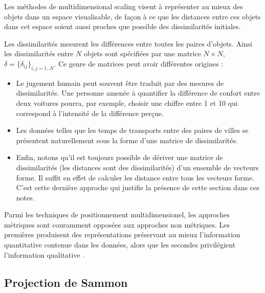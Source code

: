 Les m\'ethodes de  multidimensional scaling visent
\`a repr\'esenter au mieux des objets dans un espace 
visualisable, de fa\c{c}on \`a ce que les distances
entre ces objets dans cet espace 
soient aussi proches que possible des dissimilarit\'es
initiales.

Les dissimilarit\'es mesurent les diff\'erences entre toutes
les paires d'objets. Ainsi les dissimilarit\'es entre $N$ objets
sont sp\'ecifi\'ees par une matrice $N \times N$,
$\delta=\{ \delta_{ij}\}_{i,j=1..N}$. Ce genre de matrices
peut avoir  diff\'erentes origines    :
\begin{itemize}
\item Le jugement humain peut souvent \^etre traduit par des
mesures de  dissimilarit\'es. Une personne amen\'ee \`a quantifier
la diff\'erence de confort entre deux voitures  pourra, par
exemple, choisir une chiffre entre 1 et 10 qui correspond 
\`a l'intensit\'e de la diff\'erence per\c{c}ue.
\item Les donn\'ees telles que les temps de transports entre
des paires de villes se pr\'esentent naturellement sous la forme
d'une matrice de dissimilarit\'es.
\item Enfin, notons qu'il est toujours possible de d\'eriver
une matrice de dissimilarit\'es 
(les distances sont des dissimilarit\'es) d'un ensemble de vecteurs
forme. Il suffit en effet de calculer les distance entre
tous les vecteurs forme. C'est cette derni\`ere approche
qui justifie la pr\'esence de cette section dans ces notes.
\end{itemize}

Parmi les techniques de positionnement multidimensionel, les
approches m\'etriques sont couramment oppos\'ees aux approches
non m\'etriques. Les premi\`eres produisent des repr\'esentations
pr\'eservant au mieux l'information quantitative \cite{Sammon1969}
contenue dans les donn\'ees, alors que les secondes privil\'egient 
l'information qualitative \cite{Kruskal1964}.    

\subsection{Projection de Sammon}

